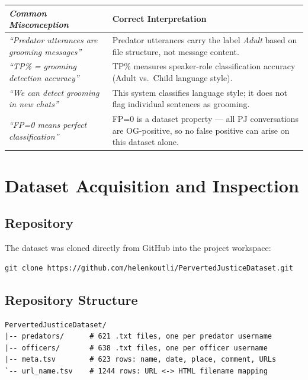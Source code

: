 \documentclass[12pt,a4paper]{article}
\begin{document}
\vspace{0.5em}
\begin{tabularx}{\linewidth}{>{\itshape}lX}
  \toprule
  \textbf{Common Misconception} & \textbf{Correct Interpretation} \\
  \midrule
  ``Predator utterances are grooming messages'' &
    Predator utterances carry the label \textit{Adult} based on file
    structure, not message content. \\
  \addlinespace
  ``TP\% = grooming detection accuracy'' &
    TP\% measures speaker-role classification accuracy
    (Adult vs.\ Child language style). \\
  \addlinespace
  ``We can detect grooming in new chats'' &
    This system classifies language style; it does not flag
    individual sentences as grooming. \\
  \addlinespace
  ``FP=0 means perfect classification'' &
    FP=0 is a dataset property --- all PJ conversations are OG-positive,
    so no false positive can arise on this dataset alone. \\
  \bottomrule
\end{tabularx}

\section{Dataset Acquisition and Inspection}

\subsection{Repository}

The dataset was cloned directly from GitHub into the project workspace:

\begin{lstlisting}
git clone https://github.com/helenkoutli/PervertedJusticeDataset.git
\end{lstlisting}

\subsection{Repository Structure}

\begin{lstlisting}
PervertedJusticeDataset/
|-- predators/      # 621 .txt files, one per predator username
|-- officers/       # 638 .txt files, one per officer username
|-- meta.tsv        # 623 rows: name, date, place, comment, URLs
`-- url_name.tsv    # 1244 rows: URL <-> HTML filename mapping
\end{lstlisting}
\end{document}
